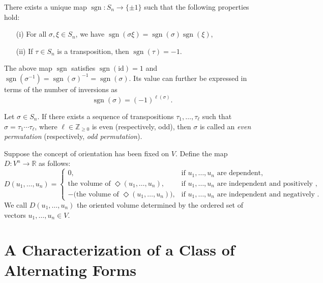 \begin{proposition}
There exists a unique map $\operatorname{sgn} : S_n \to \{\pm 1\}$ such that the following properties hold:
\begin{itemize}
    \item[(i)] For all $\sigma, \xi \in S_n$, we have $\operatorname{sgn}(\sigma\xi) = \operatorname{sgn}(\sigma)\operatorname{sgn}(\xi)$,
    \item[(ii)] If $\tau \in S_n$ is a transposition, then $\operatorname{sgn}(\tau) = -1$.
\end{itemize}
The above map $\operatorname{sgn}$ satisfies $\operatorname{sgn}(\mathrm{id}) = 1$ and $\operatorname{sgn}(\sigma^{-1}) = \operatorname{sgn}(\sigma)^{-1} = \operatorname{sgn}(\sigma)$. Its value can further be expressed in terms of the number of inversions as
\[
\operatorname{sgn}(\sigma) = (-1)^{\ell(\sigma)}.
\]
\end{proposition}

\begin{definition}
Let $\sigma \in S_n$. If there exists a sequence of transpositions $\tau_1, \ldots, \tau_\ell$ such that $\sigma = \tau_1 \cdots \tau_\ell$, where $\ell \in \mathbb{Z}_{\geq 0}$ is even (respectively, odd), then $\sigma$ is called an \emph{even permutation} (respectively, \emph{odd permutation}).
\end{definition}

\begin{definition}
Suppose the concept of orientation has been fixed on $V$. Define the map $D : V^n \to \mathbb{R}$ as follows:
\[
D(u_1, \ldots, u_n) =
\begin{cases}
0, & \text{if } u_1, \ldots, u_n \text{ are dependent}, \\
\text{the volume of } \Diamond(u_1, \ldots, u_n), & \text{if } u_1, \ldots, u_n \text{ are independent and positively }, \\
-\big(\text{the volume of } \Diamond(u_1, \ldots, u_n)\big), & \text{if } u_1, \ldots, u_n \text{ are independent and negatively }.
\end{cases}
\]
We call $D(u_1, \ldots, u_n)$ the oriented volume determined by the ordered set of vectors $u_1, \ldots, u_n \in V$.
\end{definition}

\section{A Characterization of a Class of Alternating Forms}


